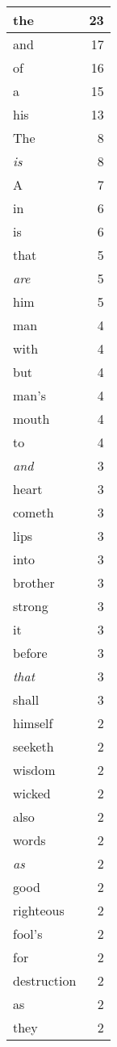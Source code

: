 \begin{center}
\begin{longtable}{l|r}
the & 23\\ \hline 
and & 17\\ \hline 
of & 16\\ \hline 
a & 15\\ \hline 
his & 13\\ \hline 
The & 8\\ \hline 
\emph{is} & 8\\ \hline 
A & 7\\ \hline 
in & 6\\ \hline 
is & 6\\ \hline 
that & 5\\ \hline 
\emph{are} & 5\\ \hline 
him & 5\\ \hline 
man & 4\\ \hline 
with & 4\\ \hline 
but & 4\\ \hline 
man's & 4\\ \hline 
mouth & 4\\ \hline 
to & 4\\ \hline 
\emph{and} & 3\\ \hline 
heart & 3\\ \hline 
cometh & 3\\ \hline 
lips & 3\\ \hline 
into & 3\\ \hline 
brother & 3\\ \hline 
strong & 3\\ \hline 
it & 3\\ \hline 
before & 3\\ \hline 
\emph{that} & 3\\ \hline 
shall & 3\\ \hline 
himself & 2\\ \hline 
seeketh & 2\\ \hline 
wisdom & 2\\ \hline 
wicked & 2\\ \hline 
also & 2\\ \hline 
words & 2\\ \hline 
\emph{as} & 2\\ \hline 
good & 2\\ \hline 
righteous & 2\\ \hline 
fool's & 2\\ \hline 
for & 2\\ \hline 
destruction & 2\\ \hline 
as & 2\\ \hline 
they & 2\\ \hline 

\end{longtable}
\end{center}
